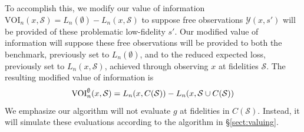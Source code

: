 \documentclass[letterpaper]{article}
\newcommand{\VOIE}{\text{VOI}^\emptyset}
\numberwithin{equation}{section}
\let\Section\S
\renewcommand{\S}{\mathcal{S}}
\newcommand{\sectn}[1]{\Section\ref{#1}}
\newcommand{\Y}{\mathcal{Y}}
\newcommand{\loss}{L}
\begin{document}
To accomplish this, we modify our value of information 
$\text{VOI}_n(x,\S) = \loss_n(\emptyset) - \loss_n(x,\S)$
to suppose free observations $\Y(x,s')$ will be provided of these problematic low-fidelity $s'$.
  Our modified value of information will suppose these free observations will be provided to both the benchmark, previously set to $\loss_n(\emptyset)$, and to the reduced expected loss, previously set to $\loss_n(x,\S)$, achieved through observing $x$ at fidelities $\S$.
The resulting modified value of information is
\begin{equation*}
\VOIE_n(x,\S) = \loss_n(x,C(\S)) - \loss_n(x,\S \cup C(\S)) \notag \\
\end{equation*}
We emphasize our algorithm will not evaluate $g$ at fidelities in $C(\S)$.  Instead, it will simulate these evaluations according to the algorithm in \sectn{sect:valuing}.






\end{document}
